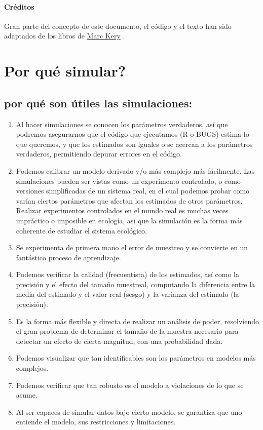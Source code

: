 \documentclass[
]{book}
\providecommand{\tightlist}{%
  \setlength{\itemsep}{0pt}\setlength{\parskip}{0pt}}
\begin{document}
\hypertarget{cruxe9ditos}{%
\subsubsection{Créditos}\label{cruxe9ditos}}

Gran parte del concepto de este documento, el código y el texto han sido adaptados de los libros de \href{http://store.elsevier.com/Marc-Kery/ELS_1059944/}{Marc Kery} \citep{Kery2012, Kery2010, kery2015applied}.

\hypertarget{why}{%
\chapter{Por qué simular?}\label{why}}

\hypertarget{por-quuxe9-son-uxfatiles-las-simulaciones}{%
\section{por qué son útiles las simulaciones:}\label{por-quuxe9-son-uxfatiles-las-simulaciones}}

\begin{enumerate}
\def\labelenumi{\arabic{enumi}.}
\tightlist
\item
  Al hacer simulaciones se conocen los parámetros verdaderos, así que podremos asegurarnos que el código que ejecutamos (R o BUGS) estima lo que queremos, y que los estimados son iguales o se acercan a los parámetros verdaderos, permitiendo depurar errores en el código.
\item
  Podemos calibrar un modelo derivado y/o más complejo más fácilmente. Las simulaciones pueden ser vistas como un experimento controlado, o como versiones simplificadas de un sistema real, en el cual podemos probar como varían ciertos parámetros que afectan los estimados de otros parámetros. Realizar experimentos controlados en el mundo real es muchas veces impráctico o imposible en ecología, así que la simulación es la forma más coherente de estudiar el sistema ecológico.
\item
  Se experimenta de primera mano el error de muestreo y se convierte en un fantástico proceso de aprendizaje.
\item
  Podemos verificar la calidad (frecuentista) de los estimados, así como la precisión y el efecto del tamaño muestreal, computando la diferencia entre la media del estimado y el valor real (sesgo) y la varianza del estimado (la precisión).
\item
  Es la forma más flexible y directa de realizar un análisis de poder, resolviendo el gran problema de determinar el tamaño de la muestra necesario para detectar un efecto de cierta magnitud, con una probabilidad dada.\\
\item
  Podemos visualizar que tan identificables son los parámetros en modelos más complejos.
\item
  Podemos verificar que tan robusto es el modelo a violaciones de lo que se asume.
\item
  Al ser capaces de simular datos bajo cierto modelo, se garantiza que uno entiende el modelo, sus restricciones y limitaciones.
\end{enumerate}
\end{document}
